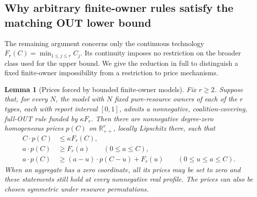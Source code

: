 \documentclass[11pt]{article}
\newcommand{\R}{\mathbb R}
\newtheorem{lemma}[theorem]{Lemma}
\theoremstyle{definition}\newtheorem{definition}[theorem]{Definition}
\theoremstyle{remark}\newtheorem{remark}[theorem]{Remark}
\begin{document}
\subsection{Why arbitrary finite-owner rules satisfy the matching OUT lower bound}

The remaining argument concerns only the continuous technology
$F_r(C)=\min_{1\le j\le r}C_j$. Its continuity imposes no restriction on
the broader class used for the upper bound. We give the reduction in full
to distinguish a fixed finite-owner impossibility from a restriction to
price mechanisms.

\begin{lemma}[Prices forced by bounded finite-owner models]
\label{dim:price-reduction}
Fix $r\ge2$. Suppose that, for every $N$, the model with $N$ fixed
pure-resource owners of each of the $r$ types, each with report interval
$[0,1]$, admits a nonnegative, coalition-covering, full-OUT rule funded by
$\kappa F_r$. Then there are nonnegative degree-zero homogeneous prices $p(C)$ on
$\R_{++}^r$, locally Lipschitz there, such that
\begin{align}
 C\cdot p(C)&\le\kappa F_r(C),\label{dim:price-budget}\\
 a\cdot p(C)&\ge F_r(a)\qquad(0\le a\le C),
 \label{dim:price-coverage}\\
 a\cdot p(C)&\ge(a-u)\cdot p(C-u)+F_r(u)
 \qquad(0\le u\le a\le C).
 \label{dim:price-out}
\end{align}
When an aggregate has a zero coordinate, all its prices may be set to
zero and these statements still hold at every nonnegative real profile.
The prices can also be chosen symmetric under resource permutations.
\end{lemma}
\end{document}
